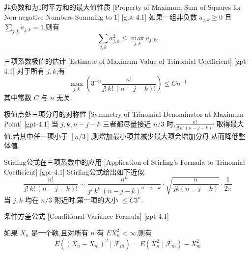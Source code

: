 \documentclass[UTF8]{ctexart}
\begin{document}
    
    
    \begin{ppt}
        {非负数和为1时平方和的最大值性质}
        [Property of Maximum Sum of Squares for Non-negative Numbers Summing to 1]
        [gpt-4.1]
        如果一组非负数 $a_{j,k} \geq 0$ 且 $\sum_{j,k} a_{j,k} = 1$,则有
\[
\sum_{j,k} a_{j,k}^{2} \le \max_{j,k} a_{j,k}.
\]

    \end{ppt}
    
    
    
    \begin{thm}
        {三项系数极值的估计}
        [Estimate of Maximum Value of Trinomial Coefficient]
        [gpt-4.1]
        对于所有 $j, k$,有
\[
\max_{j,k} \left( 3^{-n} \frac{n!}{j! \, k! \, (n-j-k)!} \right) \leq C n^{-1}
\]
其中常数 $C$ 与 $n$ 无关.

    \end{thm}
    
    
    
    \begin{ppt}
        {极值点处三项分母的对称性}
        [Symmetry of Trinomial Denominator at Maximum Point]
        [gpt-4.1]
        当 $j, k, n-j-k$ 三者都尽量接近 $n/3$ 时,$\frac{n!}{j! \, k! \, (n-j-k)!}$ 取得最大值;若其中任一项小于 $[n/3]$,则增加最小项并减少最大项会增加分母,从而降低整体值.

    \end{ppt}
    
    
    
    \begin{ppt}
        {Stirling公式在三项系数中的应用}
        [Application of Stirling's Formula to Trinomial Coefficient]
        [gpt-4.1]
        Stirling公式给出如下近似:
\[
\frac{n!}{j! \, k! \, (n-j-k)!} \sim \frac{n^{n}}{j^{j} \, k^{k} \, (n-j-k)^{n-j-k}} \cdot \sqrt{ \frac{n}{j k (n-j-k)} } \cdot \frac{1}{2\pi}
\]
当 $j, k$ 均在 $n/3$ 附近时,第一项的大小 $\leq C 3^{n}$.

    \end{ppt}
    
    
    
    \begin{thm}
        {条件方差公式}
        [Conditional Variance Formula]
        [gpt-4.1]
        
如果 $X_n$ 是一个鞅,且对所有 $n$ 有 $E X_n^2 < \infty$,则有
\[
E \left( (X_n - X_m)^2 \mid \mathcal{F}_m \right) = E \left( X_n^2 \mid \mathcal{F}_m \right) - X_m^2
\]

    \end{thm}
    
\end{document}
